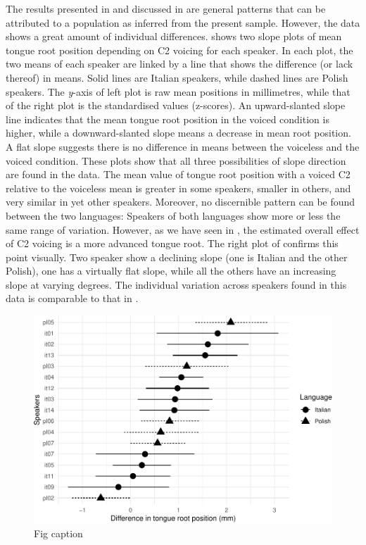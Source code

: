 \documentclass[12pt,]{article}
\begin{document}
The results presented in  and discussed in
 are general patterns that can be attributed to a
population as inferred from the present sample. However, the data shows
a great amount of individual differences. 
shows two slope plots of mean tongue root position depending on C2
voicing for each speaker. In each plot, the two means of each speaker
are linked by a line that shows the difference (or lack thereof) in
means. Solid lines are Italian speakers, while dashed lines are Polish
speakers. The \emph{y}-axis of left plot is raw mean positions in
millimetres, while that of the right plot is the standardised values
(z-scores). An upward-slanted slope line indicates that the mean tongue
root position in the voiced condition is higher, while a
downward-slanted slope means a decrease in mean root position. A flat
slope suggests there is no difference in means between the voiceless and
the voiced condition. These plots show that all three possibilities of
slope direction are found in the data. The mean value of tongue root
position with a voiced C2 relative to the voiceless mean is greater in
some speakers, smaller in others, and very similar in yet other
speakers. Moreover, no discernible pattern can be found between the two
languages: Speakers of both languages show more or less the same range
of variation. However, as we have seen in , the
estimated overall effect of C2 voicing is a more advanced tongue root.
The right plot of  confirms this point
visually. Two speaker show a declining slope (one is Italian and the
other Polish), one has a virtually flat slope, while all the others have
an increasing slope at varying degrees. The individual variation across
speakers found in this data is comparable to that in \citet{ahn2018}.

\begin{figure}
\includegraphics[width=\linewidth]{2018-tra_files/figure-latex/trp-difference-1} \caption{Fig caption}\label{f:trp-difference}
\end{figure}
\end{document}
